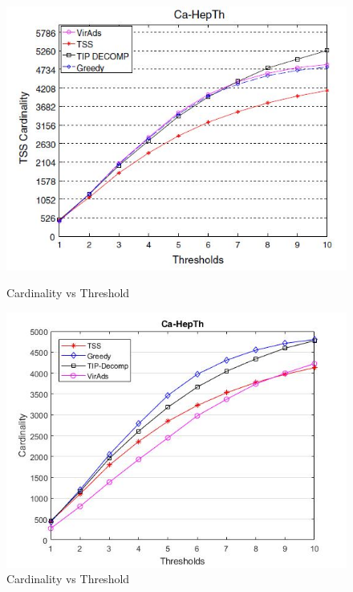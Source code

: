 \begin{figure}[h!]
\begin{minipage}[t]{0.50\textwidth}
\includegraphics[width=\linewidth,keepaspectratio=true]{images/ca-hepthpaper.jpg}
\caption{Cardinality vs Threshold}

\end{minipage}
\begin{minipage}[t]{0.50\textwidth}
\includegraphics[width=\linewidth,keepaspectratio=true]{images/ca-hepthresult.jpg}
\caption{Cardinality vs Threshold}
\end{minipage}
\end{figure}

